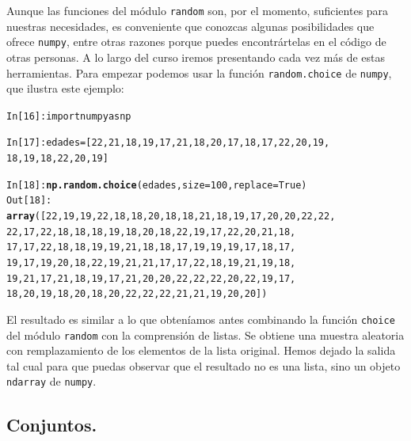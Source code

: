 \documentclass[10pt,a4paper]{article}\usepackage[]{graphicx}\usepackage[]{color}
\makeatletter
\newcommand{\hlkwd}[1]{\textcolor[rgb]{0.737,0.353,0.396}{\textbf{#1}}}%
\newenvironment{kframe}{%
 \def\at@end@of@kframe{}%
 \ifinner\ifhmode%
  \def\at@end@of@kframe{\end{minipage}}%
  \begin{minipage}{\columnwidth}%
 \fi\fi%
 \def\FrameCommand##1{\hskip\@totalleftmargin \hskip-\fboxsep
 \colorbox{shadecolor}{##1}\hskip-\fboxsep
     \hskip-\linewidth \hskip-\@totalleftmargin \hskip\columnwidth}%
 \MakeFramed {\advance\hsize-\width
   \@totalleftmargin\z@ \linewidth\hsize
   \@setminipage}}%
 {\par\unskip\endMakeFramed%
 \at@end@of@kframe}
\newenvironment{knitrout}{}{} %
\newcounter {cont01}
\makeatother
\begin{document}
Aunque las funciones del módulo {\tt random} son, por el momento, suficientes para nuestras necesidades, es conveniente que conozcas algunas posibilidades que ofrece {\tt numpy}, entre otras razones porque puedes encontrártelas en el código de otras personas. A lo largo del curso iremos presentando cada vez más de estas herramientas. Para empezar podemos usar la función {\tt random.choice} de {\tt numpy}, que ilustra este ejemplo:
\begin{knitrout}
\color{fgcolor}\begin{kframe}
\begin{alltt}
In [16]: import numpy as np

In [17]: edades = [22, 21, 18, 19, 17, 21, 18, 20, 17, 18, 17, 22, 20, 19,
18, 19, 18, 22, 20, 19]

In [18]: \hlkwd{np.random.choice}(edades, size=100, replace=True)
Out[18]:
\hlkwd{array}([22, 19, 19, 22, 18, 18, 20, 18, 18, 21, 18, 19, 17, 20, 20, 22, 22,
       22, 17, 22, 18, 18, 18, 19, 18, 20, 18, 22, 19, 17, 22, 20, 21, 18,
       17, 17, 22, 18, 18, 19, 19, 21, 18, 18, 17, 19, 19, 19, 17, 18, 17,
       19, 17, 19, 20, 18, 22, 19, 21, 21, 17, 17, 22, 18, 19, 21, 19, 18,
       19, 21, 17, 21, 18, 19, 17, 21, 20, 20, 22, 22, 22, 20, 22, 19, 17,
       18, 20, 19, 18, 20, 18, 20, 22, 22, 22, 21, 21, 19, 20, 20])
\end{alltt}
\end{kframe}
\end{knitrout}
El resultado es similar a lo que obteníamos antes combinando la función {\tt choice} del módulo {\tt random} con la comprensión de listas. Se obtiene una muestra aleatoria con remplazamiento de los elementos de la lista original. Hemos dejado la salida tal cual para que puedas observar que el resultado no es una lista, sino un objeto {\tt ndarray} de {\tt numpy}.

\subsection{Conjuntos.}
\label{tut02:subsec:conjuntos}
\end{document}
